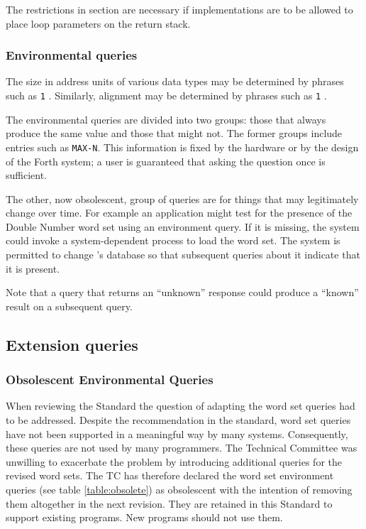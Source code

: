 The restrictions in section 
are necessary if implementations are to be allowed to place loop
parameters on the return stack.

\addtocounter{subsubsection}{2}
\subsubsection{Environmental queries} %

The size in address units of various data types may be determined by
phrases such as \texttt{1} . Similarly, alignment may be
determined by phrases such as \texttt{1} .

The environmental queries are divided into two groups: those that
always produce the same value and those that might not. The former
groups include entries such as \texttt{MAX-N}. This information is
fixed by the hardware or by the design of the Forth system; a user
is guaranteed that asking the question once is sufficient.

The other, now obsolescent, group of queries are for things that may
legitimately change over time. For example an application might test
for the presence of the Double Number word set using an environment
query.  If it is missing, the system could invoke a system-dependent
process to load the word set. The system is permitted to change
's database so that subsequent queries about
it indicate that it is present.

Note that a query that returns an ``unknown'' response could produce
a ``known'' result on a subsequent query.

\subsection{Extension queries}

\subsubsection{Obsolescent Environmental Queries} %
\label{rat:obsolete}

When reviewing the  Standard the question of adapting the word set
queries had to be addressed.  Despite the recommendation in the
 standard, word set queries have not been
supported in a meaningful way by many systems.  Consequently, these
queries are not used by many programmers.  The Technical Committee
was unwilling to exacerbate the problem by introducing additional
queries for the revised word sets.  The TC has therefore declared
the word set environment queries (see table \ref{table:obsolete}) as
obsolescent with the intention of removing them altogether in the
next revision.
They are retained in this Standard to support existing 
programs.  New programs should not use them.

